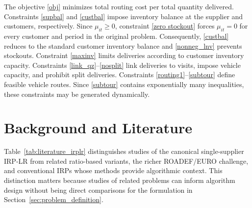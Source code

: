 \documentclass{article}
\begin{document}
The objective \eqref{obj} minimizes total routing cost per total quantity
delivered. Constraints \eqref{supbal} and \eqref{custbal} impose inventory
balance at the supplier and customers, respectively. Since $\mu_{it}\geq0$,
constraint \eqref{zero stockout} forces $\mu_{it}=0$ for every customer and
period in the original problem. Consequently, \eqref{custbal} reduces to
the standard customer inventory balance and \eqref{nonneg_lnv} prevents
stockouts. Constraint \eqref{maxinv} limits deliveries according to
customer inventory capacity. Constraints \eqref{link_qz}--\eqref{nosplit}
link deliveries to visits, impose vehicle capacity, and prohibit split
deliveries. Constraints \eqref{routing1}--\eqref{subtour} define feasible
vehicle routes. Since \eqref{subtour} contains exponentially many
inequalities, these constraints may be generated dynamically.



\section{Background and Literature}
\label{sec:background_literature}

Table~\ref{tab:literature_irplr} distinguishes studies of the canonical
single-supplier IRP-LR from related ratio-based variants, the richer
ROADEF/EURO challenge, and conventional IRPs whose methods provide
algorithmic context. This distinction matters because studies of related
problems can inform algorithm design without being direct comparisons for
the formulation in Section~\ref{sec:problem_definition}.
\end{document}
